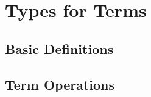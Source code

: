\section{Types for Terms}\label{sec:types-terms}

\subsection{Basic Definitions}\label{sec:types-basic-defs}
{}




\subsection{Term Operations}\label{sec:term-operations}


